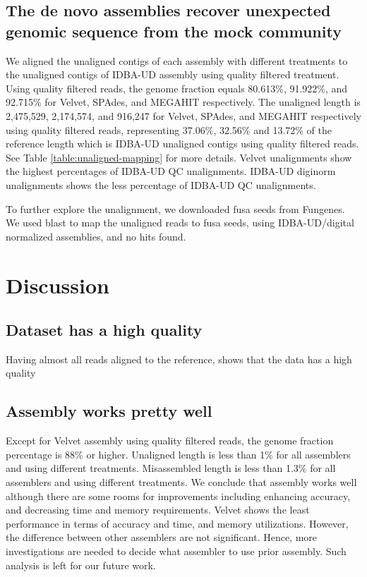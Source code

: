 \subsection*{The de novo assemblies recover unexpected genomic sequence from the mock community}

We aligned the unaligned contigs of each assembly with different treatments to the unaligned contigs of IDBA-UD assembly using quality filtered treatment. 
Using quality filtered reads, the genome fraction equals 80.613\%, 91.922\%, and 92.715\% for Velvet, SPAdes, and MEGAHIT respectively.  The unaligned length is 2,475,529, 2,174,574, and  916,247  for Velvet, SPAdes, and MEGAHIT respectively using quality filtered reads, representing 37.06\%, 32.56\% and 13.72\% of the reference length which is IDBA-UD unaligned contigs using quality filtered reads. See Table \ref{table:unaligned-mapping} for more details.  Velvet unalignments show the highest percentages of IDBA-UD QC unalignments. IDBA-UD diginorm unalignments shows the less percentage of IDBA-UD QC unalignments. 

To further explore the unalignment, we downloaded fusa seeds from Fungenes. We used blast to map the unaligned reads to fusa seeds,  using IDBA-UD/digital normalized  assemblies, and no hits found. 


\section*{Discussion}
 
 \subsection*{Dataset has a high quality} 
 Having almost all reads aligned to the reference, shows that the data has a high quality
 
 \subsection*{Assembly works pretty well} 
 Except for Velvet assembly using quality filtered reads, the genome fraction percentage is  88\% or higher.  Unaligned length is less than 1\% for all assemblers and using different treatments. 
 Misassembled length is less than 1.3\% for all assemblers and using different treatments. We conclude that assembly works well although there are some rooms for improvements including enhancing accuracy, and decreasing time and memory requirements. Velvet shows the least performance in terms of accuracy and time, and memory utilizations. However, the difference between other assemblers are not significant. Hence, more investigations are needed to decide what assembler to use prior assembly. Such analysis is left for our future work. 
 
